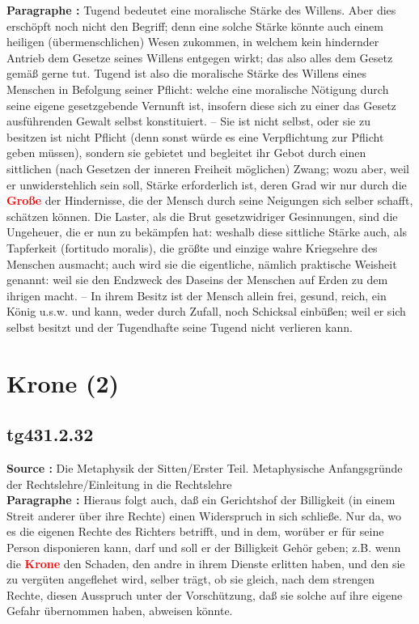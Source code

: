 \documentclass[a4paper,12pt,twoside]{book}
\newcommand{\match}[1]{\textcolor{red}{\textbf{#1}}}
\newcommand{\unnumberedsection}[1]{
	\section*{#1}
	\addcontentsline{toc}{section}{#1}
	\markright{#1}
}
\begin{document}
	\textbf{Paragraphe : }Tugend bedeutet eine moralische Stärke des Willens. Aber dies erschöpft noch nicht den Begriff; denn eine solche Stärke könnte auch einem heiligen (übermenschlichen) Wesen zukommen, in welchem kein hindernder Antrieb dem Gesetze seines Willens entgegen wirkt; das also alles dem Gesetz gemäß gerne tut. Tugend ist also die moralische Stärke des Willens eines Menschen in Befolgung seiner Pflicht: welche eine moralische Nötigung durch seine eigene gesetzgebende Vernunft ist, insofern diese sich zu einer das Gesetz ausführenden Gewalt selbst konstituiert. – Sie ist nicht selbst, oder sie zu besitzen ist nicht Pflicht (denn sonst würde es eine Verpflichtung zur Pflicht geben müssen), sondern sie gebietet und begleitet ihr Gebot durch einen sittlichen (nach Gesetzen der inneren Freiheit möglichen) Zwang; wozu aber, weil er unwiderstehlich sein soll, Stärke erforderlich ist, deren Grad wir nur durch die \match{Große} der Hindernisse, die der Mensch durch seine Neigungen sich selber schafft, schätzen können. Die Laster, als die Brut gesetzwidriger Gesinnungen, sind die Ungeheuer, die er nun zu bekämpfen hat: weshalb diese sittliche Stärke auch, als Tapferkeit (fortitudo moralis), die größte und einzige wahre Kriegsehre des Menschen ausmacht; auch wird sie die eigentliche, nämlich praktische Weisheit genannt: weil sie den Endzweck des Daseins der Menschen auf Erden zu dem ihrigen macht. – In ihrem Besitz ist der Mensch allein frei, gesund, reich, ein König u.s.w. und kann, weder durch Zufall, noch Schicksal einbüßen; weil er sich selbst besitzt und der Tugendhafte seine Tugend nicht verlieren kann. 
	
	\unnumberedsection{Krone (2)} 
	\subsection*{tg431.2.32} 
	\textbf{Source : }Die Metaphysik der Sitten/Erster Teil. Metaphysische Anfangsgründe der Rechtslehre/Einleitung in die Rechtslehre\\  
	
	\textbf{Paragraphe : }Hieraus folgt auch, daß ein Gerichtshof der Billigkeit (in einem Streit anderer über ihre Rechte) einen Widerspruch in sich schließe. Nur da, wo es die eigenen Rechte des Richters betrifft, und in dem, worüber er für seine Person disponieren kann, darf und soll er der Billigkeit Gehör geben; z.B. wenn die \match{Krone} den Schaden, den andre in ihrem Dienste erlitten haben, und den sie zu vergüten angeflehet wird, selber trägt, ob sie gleich, nach dem strengen Rechte, diesen Ausspruch unter der Vorschützung, daß sie solche auf ihre eigene Gefahr übernommen haben, abweisen könnte. 
	
\end{document}

